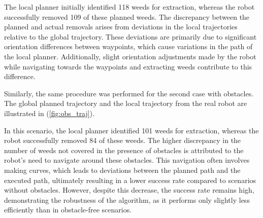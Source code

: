 \vspace*{6mm}   


The local planner initially identified 118 weeds for extraction, whereas the robot successfully removed 109 of these planned weeds. The discrepancy between the planned and actual removals arises from deviations in the local trajectories relative to the global trajectory. These deviations are primarily due to significant orientation differences between waypoints, which cause variations in the path of the local planner. Additionally, slight orientation adjustments made by the robot while navigating towards the waypoints and extracting weeds contribute to this difference. 




\vspace*{6mm}   


Similarly, the same procedure was performed for the second case with obstacles. The global planned trajectory and the local trajectory from the real robot are illustrated in (\autoref{fig:obs_traj}). 


In this scenario, the local planner identified 101 weeds for extraction, whereas the robot successfully removed 84 of these weeds. The higher discrepancy in the number of weeds not covered in the presence of obstacles is attributed to the robot's need to navigate around these obstacles. This navigation often involves making curves, which leads to deviations between the planned path and the executed path, ultimately resulting in a lower success rate compared to scenarios without obstacles. However, despite this decrease, the success rate remains high, demonstrating the robustness of the algorithm, as it performs only slightly less efficiently than in obstacle-free scenarios.

